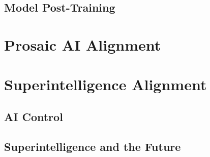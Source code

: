 \subsection{Model Post-Training}





\section{Prosaic AI Alignment}

\section{Superintelligence Alignment}

\subsection{AI Control}

\subsection{Superintelligence and the Future}
